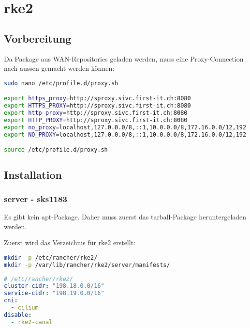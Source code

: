 
\section{rke2}
\subsection{Vorbereitung}
Da Package aus WAN-Repositories geladen werden, muss eine Proxy-Connection nach aussen gemacht werden können:
\lstset{style=gra_codestyle}
\begin{lstlisting}[language=bash, caption=Proxy Settings,captionpos=b,label={lst:proxy-settings},breaklines=true]
sudo nano /etc/profile.d/proxy.sh

export https_proxy=http://sproxy.sivc.first-it.ch:8080
export HTTPS_PROXY=http://sproxy.sivc.first-it.ch:8080
export http_proxy=http://sproxy.sivc.first-it.ch:8080
export HTTP_PROXY=http://sproxy.sivc.first-it.ch:8080
export no_proxy=localhost,127.0.0.0/8,::1,10.0.0.0/8,172.16.0.0/12,192.168.0.0/16
export NO_PROXY=localhost,127.0.0.0/8,::1,10.0.0.0/8,172.16.0.0/12,192.168.0.0/16

source /etc/profile.d/proxy.sh
\end{lstlisting}

\subsection{Installation}
\subsubsection{server - sks1183}
Es gibt kein apt-Package.
Daher muss zuerst das tarball-Package heruntergeladen werden.

Zuerst wird das Verzeichnis für rke2 erstellt:
\lstset{style=gra_codestyle}
\begin{lstlisting}[language=bash, caption=rke2 server - Verzeichnis erstellen,captionpos=b,label={lst:rke2-server-mkdir-rke2},breaklines=true]
mkdir -p /etc/rancher/rke2/
mkdir -p /var/lib/rancher/rke2/server/manifests/
\end{lstlisting}

\lstset{style=gra_codestyle}
\begin{lstlisting}[language=yaml, caption=rke2 server - config.yaml,captionpos=b,label={lst:rke2-server-config.yaml},breaklines=true]
# /etc/rancher/rke2/
cluster-cidr: "198.18.0.0/16"
service-cidr: "198.19.0.0/16"
cni:
  - cilium
disable:
  - rke2-canal
\end{lstlisting}

